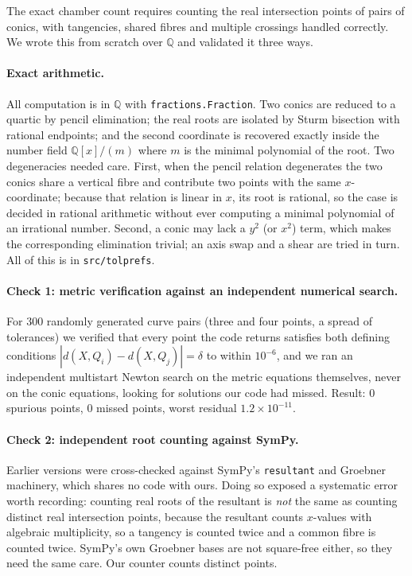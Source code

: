 ﻿\documentclass[11pt,a4paper]{article}
\theoremstyle{definition}
\theoremstyle{remark}
\begin{document}
The exact chamber count requires counting the real intersection points of pairs
of conics, with tangencies, shared fibres and multiple crossings handled
correctly.  We wrote this from scratch over $\mathbb{Q}$ and validated it three
ways.

\paragraph{Exact arithmetic.}
All computation is in $\mathbb{Q}$ with \texttt{fractions.Fraction}.  Two conics
are reduced to a quartic by pencil elimination; the real roots are isolated by
Sturm bisection with rational endpoints; and the second coordinate is recovered
exactly inside the number field $\mathbb{Q}[x]/(m)$ where $m$ is the minimal
polynomial of the root.  Two degeneracies needed care.  First, when the pencil
relation degenerates the two conics share a vertical fibre and contribute two
points with the same $x$-coordinate; because that relation is linear in $x$, its
root is rational, so the case is decided in rational arithmetic without ever
computing a minimal polynomial of an irrational number.  Second, a conic may
lack a $y^2$ (or $x^2$) term, which makes the corresponding elimination trivial;
an axis swap and a shear are tried in turn.  All of this is in
\texttt{src/tolprefs}.

\paragraph{Check 1: metric verification against an independent numerical search.}
For $300$ randomly generated curve pairs (three and four points, a spread of
tolerances) we verified that every point the code returns satisfies both defining
conditions $|d(X,Q_i)-d(X,Q_j)|=\delta$ to within $10^{-6}$, and we ran an
independent multistart Newton search on the metric equations themselves, never on
the conic equations, looking for solutions our code had missed.  Result: $0$
spurious points, $0$ missed points, worst residual $1.2\times10^{-11}$.

\paragraph{Check 2: independent root counting against SymPy.}
Earlier versions were cross-checked against SymPy's \texttt{resultant} and
Groebner machinery, which shares no code with ours.  Doing so exposed a
systematic error worth recording: counting real roots of the resultant is
\emph{not} the same as counting distinct real intersection points, because the
resultant counts $x$-values with algebraic multiplicity, so a tangency is counted
twice and a common fibre is counted twice.  SymPy's own Groebner bases are not
square-free either, so they need the same care.  Our counter counts distinct
points.
\end{document}
